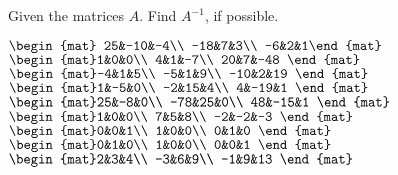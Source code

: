 
\begin{Exercise}[
name={},
title={}, 
difficulty=0,
origin={\cite{GH}}]
Given the matrices $A$. Find $A^{-1}$, if possible.
\begin{multicols}{2}
\Question $\begin{mat} 25&-10&-4\\  -18&7&3\\  -6&2&1\end{mat}$
\Question $\begin{mat}1&0&0\\  4&1&-7\\  20&7&-48 \end{mat}$
\Question $\begin{mat}-4&1&5\\  -5&1&9\\  -10&2&19 \end{mat}$
\Question $\begin{mat}1&-5&0\\  -2&15&4\\  4&-19&1 \end{mat}$
\Question $\begin{mat}25&-8&0\\  -78&25&0\\  48&-15&1 \end{mat}$
\Question $\begin{mat}1&0&0\\  7&5&8\\  -2&-2&-3 \end{mat}$
\Question $\begin{mat}0&0&1\\  1&0&0\\  0&1&0 \end{mat}$
\Question $\begin{mat}0&1&0\\  1&0&0\\  0&0&1 \end{mat}$
\Question $\begin{mat}2&3&4\\  -3&6&9\\  -1&9&13 \end{mat}$

\end{multicols}
\end{Exercise}
